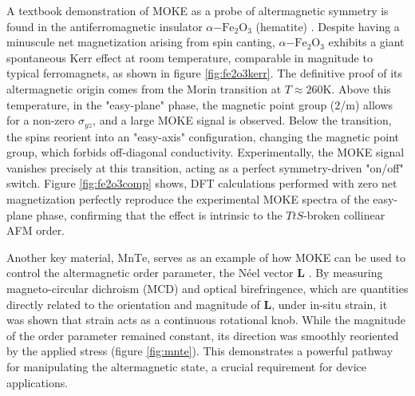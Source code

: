 \documentclass{article}
\begin{document}
A textbook demonstration of MOKE as a probe of altermagnetic symmetry is found in the antiferromagnetic insulator \(\alpha\mathrm{-Fe}_2\textrm{O}_3\) (hematite) \cite{yoshimochi2026large}. Despite having a minuscule net magnetization arising from spin canting, \(\alpha\mathrm{-Fe}_2\textrm{O}_3\) exhibits a giant spontaneous Kerr effect at room temperature, comparable in magnitude to typical ferromagnets, as shown in figure \ref{fig:fe2o3kerr}. The definitive proof of its altermagnetic origin comes from the Morin transition at \(T \approx 260 \mathrm{ K}\). Above this temperature, in the "easy-plane" phase, the magnetic point group (2/m) allows for a non-zero \(\sigma_{yz}\), and a large MOKE signal is observed. Below the transition, the spins reorient into an "easy-axis" configuration, changing the magnetic point group, which forbids off-diagonal conductivity. Experimentally, the MOKE signal vanishes precisely at this transition, acting as a perfect symmetry-driven "on/off" switch. Figure \ref{fig:fe2o3comp} shows, DFT calculations performed with zero net magnetization perfectly reproduce the experimental MOKE spectra of the easy-plane phase, confirming that the effect is intrinsic to the $TtS$-broken collinear AFM order.

Another key material, $\mathrm{MnTe}$, serves as an example of how MOKE can be used to control the altermagnetic order parameter, the Néel vector $\mathbf{L}$ \cite{liebman-pelaez2026strain}. By measuring magneto-circular dichroism (MCD) and optical birefringence, which are quantities directly related to the orientation and magnitude of $\mathbf{L}$, under in-situ strain, it was shown that strain acts as a continuous rotational knob. While the magnitude of the order parameter remained constant, its direction was smoothly reoriented by the applied stress (figure \ref{fig:mnte}). This demonstrates a powerful pathway for manipulating the altermagnetic state, a crucial requirement for device applications.
\end{document}
